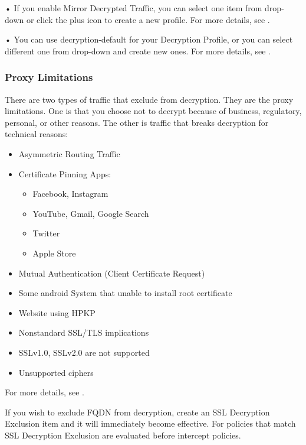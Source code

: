 • If you enable Mirror Decrypted Traffic, you can select one item from drop-down or click the plus icon to create a new profile. For more details, see \hyperlink{link:Traffic Mirror Profile}{\color{linkblue}{Traffic Mirror Profile}}.


• You can use decryption-default for your Decryption Profile, or you can select different one from drop-down and create new ones. For more details, see \hyperlink{link:Decryption Profile}{\color{linkblue}{Decryption Profile}}.

\subsubsection*{\hypertarget{link:Proxy Limitations}{Proxy Limitations}}
\label{sec:policies:security:intercept:limitation}

There are two types of traffic that exclude from decryption. They are the proxy limitations. One is that you choose not to decrypt because of business, regulatory, 
personal, or other reasons. The other is traffic that breaks decryption for technical reasons:


\begin{itemize}
    \item Asymmetric Routing Traffic 
    \item Certificate Pinning Apps:
    \begin{itemize}
        \item[-] Facebook, Instagram
        \item[-] YouTube, Gmail, Google Search
        \item[-] Twitter
        \item[-] Apple Store   
    \end{itemize} 
    \item Mutual Authentication (Client Certificate Request) 
    \item Some android System that unable to install root certificate
    \item Website using HPKP
    \item Nonstandard SSL/TLS implications
    \item SSLv1.0, SSLv2.0 are not supported
    \item Unsupported ciphers          
\end{itemize}
For more details, see \hyperlink{link:SSL Decryption Exclulsion}{\color{linkblue}{SSL Decryption Exclulsion}}.


If you wish to exclude FQDN from decryption, create an SSL Decryption Exclusion item and it will immediately become effective. 
For policies that match SSL Decryption Exclusion are evaluated before intercept policies.

